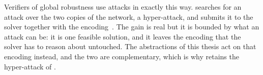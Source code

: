 Verifiers of global robustness use attacks in exactly this way.
\baseline searches for an attack over the two copies of the network,
a hyper-attack, and submits it to the solver together with the
encoding~\citep{kabaha2024vhagar}. The gain is real but it is bounded
by what an attack can be: it is one feasible solution, and it leaves
the encoding that the solver has to reason about untouched. The
abstractions of this thesis act on that encoding instead, and the two
are complementary, which is why \tool retains the hyper-attack of
\baseline.



